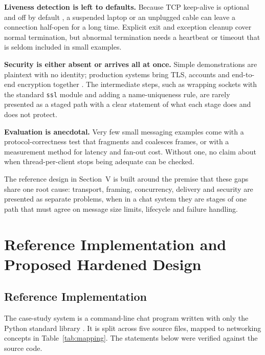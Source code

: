 \documentclass[conference]{IEEEtran}
\newcommand{\code}[1]{\texttt{#1}}
\begin{document}
\textbf{Liveness detection is left to defaults.} Because TCP keep-alive is optional and off by default \cite{rfc1122}, a suspended laptop or an unplugged cable can leave a connection half-open for a long time. Explicit exit and exception cleanup cover normal termination, but abnormal termination needs a heartbeat or timeout that is seldom included in small examples.

\textbf{Security is either absent or arrives all at once.} Simple demonstrations are plaintext with no identity; production systems bring TLS, accounts and end-to-end encryption together \cite{rfc8446,unger,signal}. The intermediate steps, such as wrapping sockets with the standard \code{ssl} module and adding a name-uniqueness rule, are rarely presented as a staged path with a clear statement of what each stage does and does not protect.

\textbf{Evaluation is anecdotal.} Very few small messaging examples come with a protocol-correctness test that fragments and coalesces frames, or with a measurement method for latency and fan-out cost. Without one, no claim about when thread-per-client stops being adequate can be checked.

The reference design in Section~V is built around the premise that these gaps share one root cause: transport, framing, concurrency, delivery and security are presented as separate problems, when in a chat system they are stages of one path that must agree on message size limits, lifecycle and failure handling.

\section{Reference Implementation and Proposed Hardened Design}

\subsection{Reference Implementation}
The case-study system is a command-line chat program written with only the Python standard library \cite{pysocket,pythreading,pystruct}. It is split across five source files, mapped to networking concepts in Table~\ref{tab:mapping}. The statements below were verified against the source code.
\end{document}
